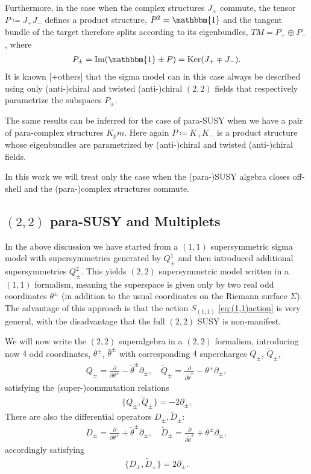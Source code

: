 \documentclass{article}
\newcommand{\id}{\mathbbm{1}}
\newcommand{\p}{\partial}
\newcommand{\tth}{\tl{\theta}}
\def\tl{\tilde}
\theoremstyle{definition}
\theoremstyle{definition}
\theoremstyle{remark}
\begin{document}
Furthermore, in the case when the complex structures $J_\pm$ commute, the tensor $P\coloneqq J_+J_-$ defines a product structure, $P^2=\id$ and the tangent bundle of the target therefore splits according to its eigenbundles, $TM=P_+\oplus P_-$, where
\begin{align*}
P_\pm=\text{Im}(\id\pm P)=\text{Ker}(J_+\mp J_-).
\end{align*}
It is known \cite{Offshell_GK}[+others] that the sigma model can in this case always be described using only (anti-)chiral and twisted (anti-)chiral $(2,2)$ fields that respectively parametrize the subspaces $P_\pm$.

The same results can be inferred for the case of para-SUSY when we have a pair of para-complex structures $K_pm$. Here again $P\coloneqq K_+K_-$ is a product structure whose eigenbundles are parametrized by (anti-)chiral and twisted (anti-)chiral fields.

In this work we will treat only the case when the (para-)SUSY algebra closes off-shell and the (para-)complex structures commute.



\subsection{$(2,2)$ para-SUSY and Multiplets}
In the above discussion we have started from a $(1,1)$ supersymmetric sigma model with supersymmetries generated by $Q^1_\pm$ and then introduced additional supersymmetries $Q^2_\pm$. This yields $(2,2)$ supersymmetric model written in a $(1,1)$ formalism, meaning the superspace is given only by two real odd coordinates $\theta^\pm$ (in addition to the usual coordinates on the Riemann surface $\Sigma$). The advantage of this approach is that the action $S_{(1,1)}$ \eqref{eq:(1,1)action} is very general, with the disadvantage that the full $(2,2)$ SUSY is non-manifest.

We will now write the $(2,2)$ superalgebra in a $(2,2)$ formalism, introducing now $4$ odd coordinates, $\theta^\pm$, $\bar{\theta}^\pm$ with corresponding $4$ supercharges $Q_\pm$, $\tl{Q}_\pm$,
\begin{align*}
Q_\pm=\frac{\p}{\p \theta^\pm}-\tth^\pm\p_\pm,\quad \tl{Q}_\pm=\frac{\p}{\p \tth^\pm}-\theta^\pm\p_\pm,
\end{align*}
satisfying the (super-)commutation relations
\begin{align}\label{eq:(2,2)_parasusy}
\{Q_\pm,\tl{Q}_\pm\}=-2\p_\pm.
\end{align}
There are also the differential operators $D_\pm,\tl{D}_\pm$:
\begin{align*}
D_\pm=\frac{\p}{\p \theta^\pm}+\tth^\pm\p_\pm,\quad \tl{D}_\pm=\frac{\p}{\p \tth^\pm}+\theta^\pm\p_\pm,
\end{align*}
accordingly satisfying
\begin{align*}
\{D_\pm,\tl{D}_\pm\}=2\p_\pm.
\end{align*}
\end{document}
